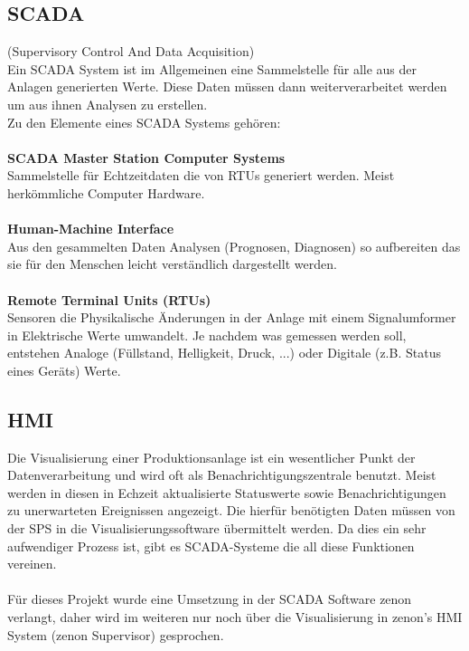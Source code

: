 \subsection{SCADA}
(Supervisory Control And Data Acquisition)\\
Ein SCADA System ist im Allgemeinen eine Sammelstelle für alle aus der Anlagen generierten Werte. Diese Daten müssen dann weiterverarbeitet werden um aus ihnen Analysen zu erstellen.\\
Zu den Elemente eines SCADA Systems gehören:\\
\\
\textbf{SCADA Master Station Computer Systems}\\
Sammelstelle für Echtzeitdaten die von RTUs generiert werden. Meist herkömmliche Computer Hardware.\\
\\
\textbf{Human-Machine Interface}\\
Aus den gesammelten Daten Analysen (Prognosen, Diagnosen) so aufbereiten das sie für den Menschen leicht verständlich dargestellt werden.\\
\\
\textbf{Remote Terminal Units (RTUs)}\\
Sensoren die Physikalische Änderungen in der Anlage mit einem Signalumformer in Elektrische Werte umwandelt. Je nachdem was gemessen werden soll, entstehen Analoge (Füllstand, Helligkeit, Druck, ...) oder Digitale (z.B. Status eines Geräts) Werte.

\subsection{HMI}
Die Visualisierung einer Produktionsanlage ist ein wesentlicher Punkt der Datenverarbeitung und wird oft als Benachrichtigungszentrale benutzt. Meist werden in diesen in Echzeit aktualisierte Statuswerte sowie Benachrichtigungen zu unerwarteten Ereignissen angezeigt. Die hierfür benötigten Daten müssen von der SPS in die Visualisierungssoftware übermittelt werden. Da dies ein sehr aufwendiger Prozess ist, gibt es SCADA-Systeme die all diese Funktionen vereinen.\\
\\
Für dieses Projekt wurde eine Umsetzung in der SCADA Software zenon verlangt, daher wird im weiteren nur noch über die Visualisierung in zenon's HMI System (zenon Supervisor) gesprochen.\\
\\

